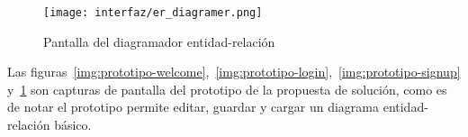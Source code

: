 \begin{figure}[H]
    \centering
    \texttt{[image: interfaz/er\_diagramer.png]}
    \caption{Pantalla del diagramador entidad-relación}
    \label{img:prototipo-er}
\end{figure}



Las figuras~\ref{img:prototipo-welcome},~\ref{img:prototipo-login},~\ref{img:prototipo-signup} y~\ref{img:prototipo-er} son capturas de pantalla del prototipo de la propuesta de solución, como es de notar el prototipo permite editar, guardar y cargar un diagrama entidad-relación básico.




